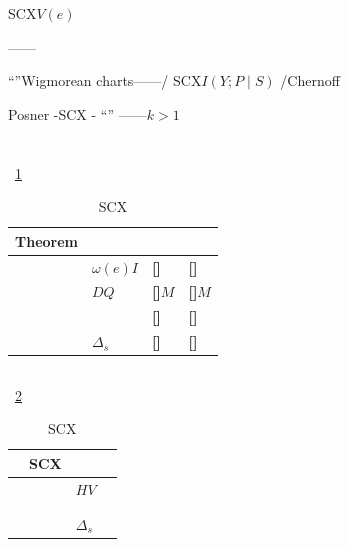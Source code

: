 \documentclass[11pt,a4paper]{article}
\theoremstyle{remark}
\newcommand{\rigorous}{\textnormal{\textbf{[]}}}
\newcommand{\heuristic}{\textnormal{\textbf{[]}}}
\begin{document}
\textbf{}SCX$V(e)$

\textbf{}——
\textbf{}

\textbf{}\cite{wigmore1937science}
``''Wigmorean charts——/
SCX\textbf{}$I(Y; P \mid S)$
/Chernoff

\textbf{}Posner\cite{posner2014economic}
-SCX
\textbf{}-
``''
\textbf{}——$k > 1$


\section{}

\subsection{}

~\ref{tab:honesty}

\begin{table}[htbp]
\centering
\caption{SCX}
\label{tab:honesty}
\begin{tabular}{@{}llll@{}}
\toprule
\textbf{Theorem} & \textbf{} & \textbf{} & \textbf{} \\
\midrule
 & $\omega(e)$$I$ & \rigorous 
                                      & \heuristic  \\
 & $D$$Q$ & \rigorous $M$
                                      & \heuristic $M$ \\
 &  & \rigorous 
                                      & \heuristic  \\
 & $\Delta_s$ & \rigorous 
                                      & \heuristic  \\
\bottomrule
\end{tabular}
\end{table}

\subsection{}

~\ref{tab:coverage}

\begin{table}[htbp]
\centering
\caption{SCX}
\label{tab:coverage}
\begin{tabular}{@{}llll@{}}
\toprule
\textbf{} & \textbf{SCX} & \textbf{} & \textbf{} \\
\midrule
 &  & $H$$V$ &  \\
 &  &  &  \\
 &  &  &  \\
 &  & $\Delta_s$ &  \\
\midrule
\end{tabular}
\end{table}
\end{document}

